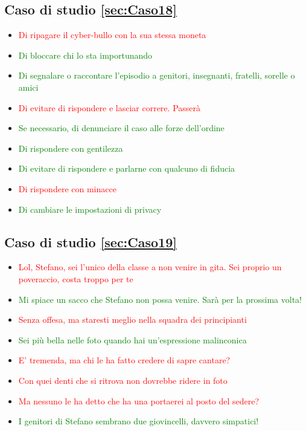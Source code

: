 \documentclass{article}
\begin{document}
\subsection{Caso di studio \ref{sec:Caso18}}
\begin{itemize}
	\item \textcolor{red}{Di ripagare il cyber-bullo con la sua stessa moneta}
	\item \textcolor{green}{Di bloccare chi lo sta importunando}
	\item \textcolor{green}{Di segnalare o raccontare l'episodio a genitori, insegnanti, fratelli, sorelle o amici}
	\item \textcolor{red}{Di evitare di rispondere e lasciar correre. Passerà}	
	\item \textcolor{green}{Se necessario, di denunciare il caso alle forze dell’ordine}
	\item \textcolor{green}{Di rispondere con gentilezza}	
	\item \textcolor{green}{Di evitare di rispondere e parlarne con qualcuno di fiducia}
	\item \textcolor{red}{Di rispondere con minacce}
	\item \textcolor{green}{Di cambiare le impostazioni di privacy}
\end{itemize}
\subsection{Caso di studio \ref{sec:Caso19}}
\begin{itemize}
	\item \textcolor{red}{Lol, Stefano, sei l'unico della classe a non venire in gita. Sei proprio un poveraccio, costa troppo per te}
	\item \textcolor{green}{Mi spiace un sacco che Stefano non possa venire. Sarà per la prossima volta!}
	\item \textcolor{red}{Senza offesa, ma staresti meglio nella squadra dei principianti}
	\item \textcolor{green}{Sei più bella nelle foto quando hai un'espressione malinconica}
	\item \textcolor{red}{E' tremenda, ma chi le ha fatto credere di sapre cantare?}
	\item \textcolor{red}{Con quei denti che si ritrova non dovrebbe ridere in foto}
	\item \textcolor{red}{Ma nessuno le ha detto che ha una portaerei al posto del sedere?}
	\item \textcolor{green}{I genitori di Stefano sembrano due giovincelli, davvero simpatici!}
\end{itemize}
\end{document}
